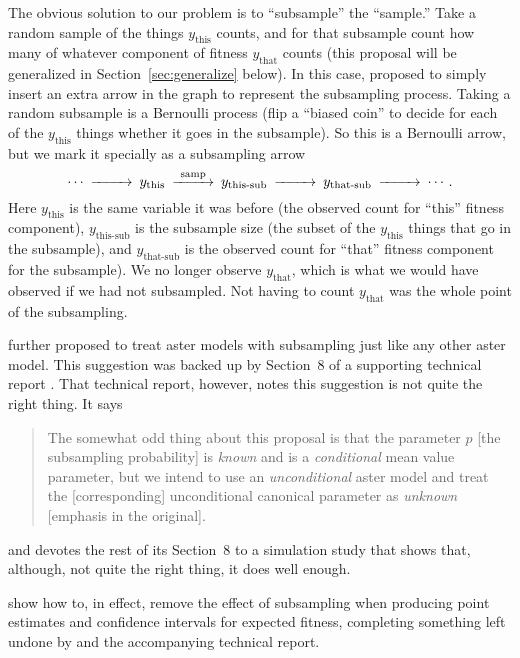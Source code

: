 The obvious solution to our problem is to ``subsample'' the ``sample.''
Take a random sample of the things $y_\text{this}$ counts,
and for that subsample count how many of whatever component
of fitness $y_\text{that}$ counts (this proposal will be generalized
in Section~\ref{sec:generalize} below).  In this case,
\citet[p.~E43]{aster2} proposed to simply insert an extra arrow in the
graph to represent the subsampling process.
Taking a random subsample is a Bernoulli process (flip a ``biased coin''
to decide for each of the $y_\text{this}$ things whether it goes in the
subsample).
So this is a Bernoulli arrow, but we mark it specially as a subsampling arrow
$$
\begin{CD}
   \cdots @>>> y_\text{this} @>\text{samp}>> y_\text{this-sub}
   @>>> y_\text{that-sub} @>>> \cdots .
\end{CD}
$$
Here $y_\text{this}$ is the same variable it was before (the observed count for
``this'' fitness component), $y_\text{this-sub}$ is the subsample size
(the subset of the $y_\text{this}$ things that go in the subsample),
and $y_\text{that-sub}$ is the observed count for ``that'' fitness component
for the subsample).  We no longer observe $y_\text{that}$, which
is what we would have observed if we had not subsampled.  Not having to
count $y_\text{that}$ was the whole point of the subsampling.

\citet{aster2} further proposed to treat aster models with subsampling
just like any other aster model.  This suggestion was backed
up by Section~8 of a supporting technical report \citep{tr661}.
That technical report, however, notes
this suggestion is not quite the right thing.  It says
\begin{quote}
The somewhat odd thing about this proposal is that the parameter
$p$ [the subsampling probability] is \emph{known} and is a \emph{conditional}
mean value parameter, but we intend to use an \emph{unconditional} aster model
and treat the [corresponding] unconditional canonical parameter as
\emph{unknown} [emphasis in the original].
\end{quote}
and devotes the rest of its Section~8 to a simulation study that shows
that, although, not quite the right thing, it does well enough.

\citet*[Appendix~S1]{stanton-geddes-et-al} show how to, in effect, remove
the effect of subsampling when producing point estimates and confidence
intervals for expected fitness, completing something left undone by
\citet{aster2} and the accompanying technical report.

